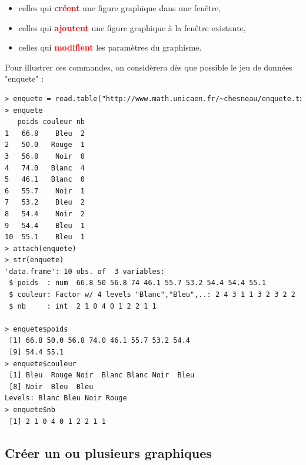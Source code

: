 \begin{itemize}
\item celles qui \textcolor{red}{\textbf{créent}} une figure graphique dans une fenêtre,
\item celles qui \textcolor{red}{\textbf{ajoutent}} une figure graphique à la fenêtre existante,
\item celles qui \textcolor{red}{\textbf{modifient}} les paramètres du graphisme.
\end{itemize}
Pour illustrer ces commandes, on considèrera dès que possible le jeu de données "enquete" :
\begin{lstlisting}[language=html]
> enquete = read.table("http://www.math.unicaen.fr/~chesneau/enquete.txt",header = T)
> enquete
   poids couleur nb
1   66.8    Bleu  2
2   50.0   Rouge  1
3   56.8    Noir  0
4   74.0   Blanc  4
5   46.1   Blanc  0
6   55.7    Noir  1
7   53.2    Bleu  2
8   54.4    Noir  2
9   54.4    Bleu  1
10  55.1    Bleu  1
> attach(enquete)
> str(enquete)
'data.frame': 10 obs. of  3 variables:
 $ poids  : num  66.8 50 56.8 74 46.1 55.7 53.2 54.4 54.4 55.1
 $ couleur: Factor w/ 4 levels "Blanc","Bleu",..: 2 4 3 1 1 3 2 3 2 2
 $ nb     : int  2 1 0 4 0 1 2 2 1 1

> enquete$poids
 [1] 66.8 50.0 56.8 74.0 46.1 55.7 53.2 54.4
 [9] 54.4 55.1
> enquete$couleur
 [1] Bleu  Rouge Noir  Blanc Blanc Noir  Bleu 
 [8] Noir  Bleu  Bleu 
Levels: Blanc Bleu Noir Rouge
> enquete$nb
 [1] 2 1 0 4 0 1 2 2 1 1
\end{lstlisting}

\subsection{Créer un ou plusieurs graphiques}
